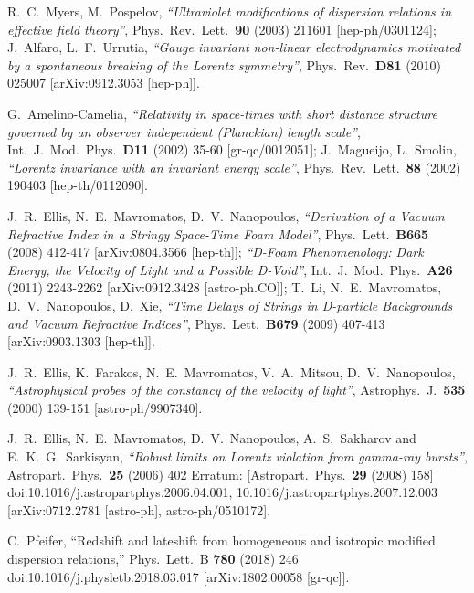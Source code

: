 \documentclass[12pt]{article}
\begin{document}
{\begin{thebibliography}{99}
  R.~C.~Myers, M.~Pospelov,
  {\it ``Ultraviolet modifications of dispersion relations in effective field theory''},
  Phys.\ Rev.\ Lett.\  {\bf 90 } (2003)  211601
  [hep-ph/0301124];
  J.~Alfaro, L.~F.~Urrutia,
  {\it ``Gauge invariant non-linear electrodynamics motivated by a spontaneous breaking of the Lorentz symmetry''},
  Phys.\ Rev.\  {\bf D81 } (2010)  025007
  [arXiv:0912.3053 [hep-ph]].

 G.~Amelino-Camelia,
  {\it ``Relativity in space-times with short distance structure governed by an observer independent (Planckian) length scale''},
  Int.\ J.\ Mod.\ Phys.\  {\bf D11 } (2002)  35-60
  [gr-qc/0012051];
  J.~Magueijo, L.~Smolin,
  {\it ``Lorentz invariance with an invariant energy scale''},
  Phys.\ Rev.\ Lett.\  {\bf 88 } (2002)  190403
  [hep-th/0112090].

  J.~R.~Ellis, N.~E.~Mavromatos, D.~V.~Nanopoulos,
  {\it ``Derivation of a Vacuum Refractive Index in a Stringy Space-Time Foam Model''},
  Phys.\ Lett.\  {\bf B665 } (2008)  412-417
  [arXiv:0804.3566 [hep-th]];
 {\it ``D-Foam Phenomenology: Dark Energy, the Velocity of Light and a Possible D-Void''},
  Int.\ J.\ Mod.\ Phys.\  {\bf A26 } (2011)  2243-2262
  [arXiv:0912.3428 [astro-ph.CO]];
  T.~Li, N.~E.~Mavromatos, D.~V.~Nanopoulos, D.~Xie,
  {\it ``Time Delays of Strings in D-particle Backgrounds and Vacuum Refractive Indices''},
  Phys.\ Lett.\  {\bf B679 } (2009)  407-413
  [arXiv:0903.1303 [hep-th]].

     J.~R.~Ellis, K.~Farakos, N.~E.~Mavromatos, V.~A.~Mitsou, D.~V.~Nanopoulos,
  {\it ``Astrophysical probes of the constancy of the velocity of light''},
  Astrophys.\ J.\  {\bf 535 } (2000)  139-151
  [astro-ph/9907340].

 J.~R.~Ellis, N.~E.~Mavromatos, D.~V.~Nanopoulos, A.~S.~Sakharov and E.~K.~G.~Sarkisyan,
  {\it ``Robust limits on Lorentz violation from gamma-ray bursts''},
  Astropart.\ Phys.\  {\bf 25} (2006) 402
   Erratum: [Astropart.\ Phys.\  {\bf 29} (2008) 158]
  doi:10.1016/j.astropartphys.2006.04.001, 10.1016/j.astropartphys.2007.12.003
  [arXiv:0712.2781 [astro-ph], astro-ph/0510172].

   C.~Pfeifer,  ``Redshift and lateshift from homogeneous and isotropic modified dispersion
relations,'' Phys.\ Lett.\ B {\bf 780} (2018) 246 doi:10.1016/j.physletb.2018.03.017 [arXiv:1802.00058 [gr-qc]].


\end{thebibliography}}
\end{document}

